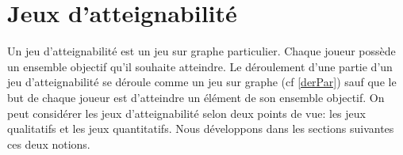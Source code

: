 
\section{Jeux d'atteignabilité}
\label{sect:jeuxAtt}

Un jeu d'atteignabilité est un jeu sur graphe particulier. Chaque joueur possède un ensemble objectif qu'il souhaite atteindre. Le déroulement d'une partie d'un jeu d'atteignabilité se déroule comme un jeu sur graphe (cf \ref{derPar}) sauf que le but de chaque joueur est d'atteindre un élément de son ensemble objectif. On peut considérer les jeux d'atteignabilité selon deux points de vue: les jeux qualitatifs et les jeux quantitatifs. Nous développons dans les sections suivantes ces deux notions.





